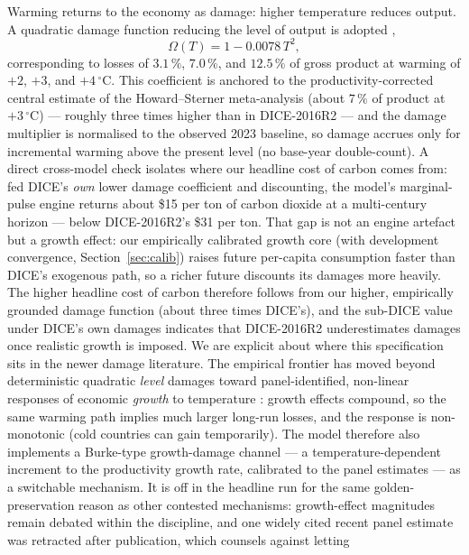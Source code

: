 \documentclass[a4paper,fleqn]{cas-sc}
\begin{document}
Warming returns to the economy as damage: higher temperature reduces output. A quadratic damage
function reducing the level of output is adopted \citep{nordhaus2017,howard2017},
\begin{equation}
\Omega(T) = 1 - 0.0078\,T^{2},
\label{eq:damage}
\end{equation}
corresponding to losses of $3.1\,\%$, $7.0\,\%$, and $12.5\,\%$ of gross product at warming of $+2$,
$+3$, and $+4\,^\circ$C. This coefficient is anchored to the productivity-corrected central estimate
of the Howard--Sterner meta-analysis (about $7\,\%$ of product at $+3\,^\circ$C) --- roughly three
times higher than in DICE-2016R2 \citep{howard2017,burke2015} --- and the damage multiplier is
normalised to the observed 2023 baseline, so damage accrues only for incremental warming above the
present level (no base-year double-count). A direct cross-model check isolates where our headline
cost of carbon comes from: fed DICE's \emph{own} lower damage coefficient and discounting, the
model's marginal-pulse engine returns about \$15 per ton of carbon dioxide at a multi-century
horizon --- below DICE-2016R2's \$31 per ton. That gap is not an engine artefact but a growth effect: our
empirically calibrated growth core (with development convergence, Section~\ref{sec:calib}) raises
future per-capita consumption faster than DICE's exogenous path, so a richer future discounts its
damages more heavily. The higher headline cost of carbon therefore follows from our higher,
empirically grounded damage function (about three times DICE's), and the sub-DICE value
under DICE's own damages indicates that DICE-2016R2 underestimates damages once realistic growth is
imposed. We are explicit about where this specification sits in the newer damage literature. The empirical
frontier has moved beyond deterministic quadratic \emph{level} damages toward panel-identified,
non-linear responses of economic \emph{growth} to temperature
\citep{burke2015,burke2023}: growth effects compound, so the same warming path implies much larger
long-run losses, and the response is non-monotonic (cold countries can gain temporarily). The
model therefore also implements a Burke-type growth-damage channel --- a temperature-dependent
increment to the productivity growth rate, calibrated to the panel estimates --- as a switchable
mechanism. It is off in the headline run for the same golden-preservation reason as other
contested mechanisms: growth-effect magnitudes remain debated within the discipline, and one
widely cited recent panel estimate was retracted after publication, which counsels against letting
\end{document}
